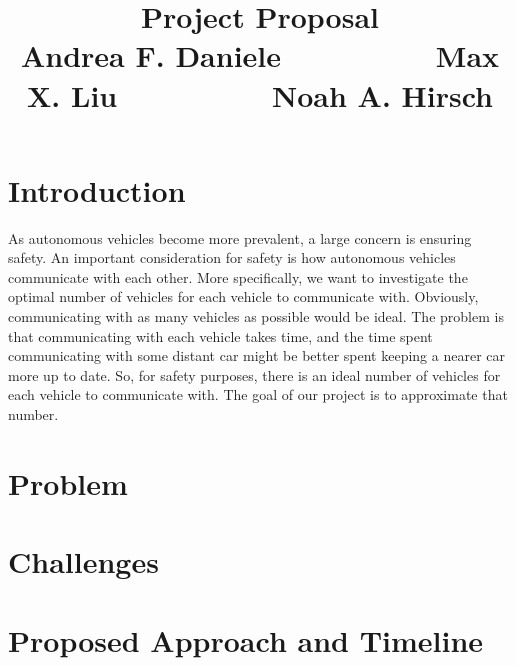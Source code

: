 \documentclass{article}
\title{Project Proposal\vspace{-6pt}\\{\large Andrea F. Daniele $\hspace{2cm}$ Max X. Liu $\hspace{2cm}$ Noah A. Hirsch }}
\begin{document}
\maketitle


\vspace{-1.2cm}

\section*{Introduction}
\vspace{-.3cm}
As autonomous vehicles become more prevalent, a large concern is ensuring safety. An important consideration for safety is how autonomous vehicles communicate with each other. More specifically, we want to investigate the optimal number of vehicles for each vehicle to communicate with. Obviously, communicating with as many vehicles as possible would be ideal. The problem is that communicating with each vehicle takes time, and the time spent communicating with some distant car might be better spent keeping a nearer car more up to date. So, for safety purposes, there is an ideal number of vehicles for each vehicle to communicate with. The goal of our project is to approximate that number.


\section*{Problem}
\vspace{-.3cm}

\section*{Challenges}
\vspace{-.3cm}

\section*{Proposed Approach and Timeline}
\vspace{-.3cm}




%
%
\end{document}
